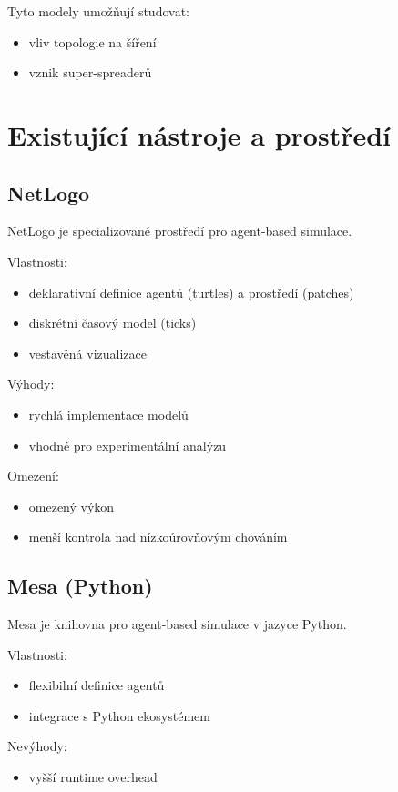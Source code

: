 Tyto modely umožňují studovat:
\begin{itemize}
\item vliv topologie na šíření
\item vznik super-spreaderů
\end{itemize}

\section{Existující nástroje a prostředí}

\subsection{NetLogo}

NetLogo je specializované prostředí pro agent-based simulace.

Vlastnosti:
\begin{itemize}
\item deklarativní definice agentů (turtles) a prostředí (patches)
\item diskrétní časový model (ticks)
\item vestavěná vizualizace
\end{itemize}

Výhody:
\begin{itemize}
\item rychlá implementace modelů
\item vhodné pro experimentální analýzu
\end{itemize}

Omezení:
\begin{itemize}
\item omezený výkon
\item menší kontrola nad nízkoúrovňovým chováním
\end{itemize}

\subsection{Mesa (Python)}

Mesa je knihovna pro agent-based simulace v jazyce Python.

Vlastnosti:
\begin{itemize}
\item flexibilní definice agentů
\item integrace s Python ekosystémem
\end{itemize}

Nevýhody:
\begin{itemize}
\item vyšší runtime overhead
\end{itemize}


